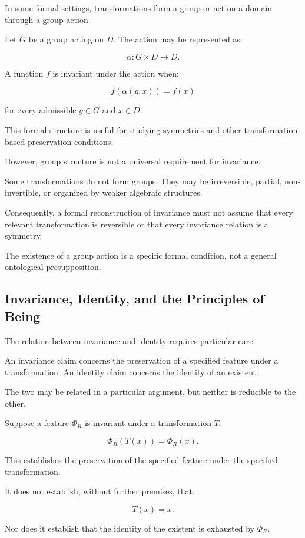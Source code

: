 In some formal settings, transformations form a
group or act on a domain through a group action.

Let \(G\) be a group acting on \(D\). The action
may be represented as:

\[
    \alpha : G \times D \rightarrow D.
\]

A function \(f\) is invariant under the action
when:

\[
    f(\alpha(g,x)) = f(x)
\]

for every admissible \(g \in G\) and \(x \in D\).

This formal structure is useful for studying
symmetries and other transformation-based
preservation conditions.

However, group structure is not a universal
requirement for invariance.

Some transformations do not form groups. They
may be irreversible, partial, non-invertible,
or organized by weaker algebraic structures.

Consequently, a formal reconstruction of
invariance must not assume that every relevant
transformation is reversible or that every
invariance relation is a symmetry.

The existence of a group action is a specific
formal condition, not a general ontological
presupposition.

\subsection{Invariance, Identity, and the Principles
of Being}

The relation between invariance and identity
requires particular care.

An invariance claim concerns the preservation
of a specified feature under a transformation.
An identity claim concerns the identity of an
existent.

The two may be related in a particular argument,
but neither is reducible to the other.

Suppose a feature \(\Phi_R\) is invariant under
a transformation \(T\):

\[
    \Phi_R(T(x)) = \Phi_R(x).
\]

This establishes the preservation of the specified
feature under the specified transformation.

It does not establish, without further premises,
that:

\[
    T(x) = x.
\]

Nor does it establish that the identity of the
existent is exhausted by \(\Phi_R\).

